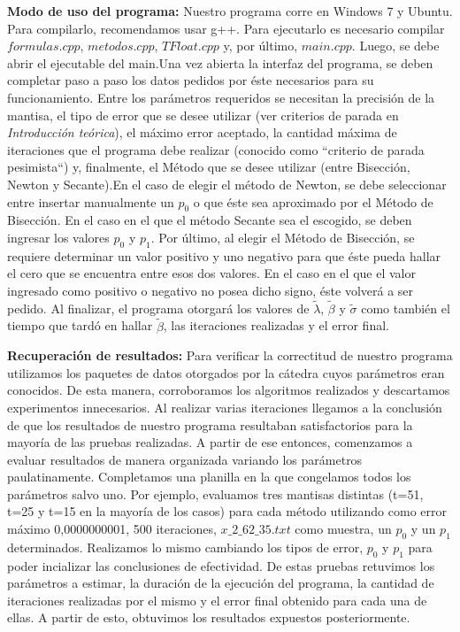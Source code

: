 \documentclass[10pt, a4paper]{article}
\begin{document}
\large{\textbf{Modo de uso del programa:}} 
Nuestro programa corre en Windows 7 y Ubuntu. Para compilarlo, recomendamos usar g++. Para ejecutarlo es necesario compilar $formulas.cpp$, $metodos.cpp$, $TFloat.cpp$ y, por \'ultimo, $main.cpp$. Luego, se debe abrir el ejecutable del main.\newline Una vez abierta la interfaz del programa, se deben completar paso a paso los datos pedidos por \'este necesarios para su funcionamiento. Entre los par\'ametros requeridos se necesitan la precisi\'on de la mantisa, el tipo de error que se desee utilizar (ver criterios de parada en  \textit{Introducci\'on te\'orica}), el m\'aximo error aceptado, la cantidad m\'axima de iteraciones que el programa debe realizar (conocido como ``criterio de parada pesimista``) y, finalmente, el M\'etodo que se desee utilizar (entre Bisecci\'on, Newton y Secante).\newline En el caso de elegir el m\'etodo de Newton, se debe seleccionar entre insertar manualmente un $p_{0}$ o que \'este sea aproximado por el M\'etodo de Bisecci\'on. En el caso en el que el m\'etodo Secante sea el escogido, se deben ingresar los valores $p_{0}$ y $p_{1}$. Por \'ultimo, al elegir el M\'etodo de Bisecci\'on, se requiere determinar un valor positivo y uno negativo para que \'este pueda hallar el cero que se encuentra entre esos dos valores. En el caso en el que el valor ingresado como positivo o negativo no posea dicho signo, \'este volver\'a a ser pedido. Al finalizar, el programa otorgar\'a los valores de $\tilde{\lambda}$, $\tilde{\beta}$ y $\tilde{\sigma}$ como tambi\'en el tiempo que tard\'o en hallar $\tilde{\beta}$, las iteraciones realizadas y el error final.\newline

\large{\textbf{Recuperaci\'on de resultados:}} Para verificar la correctitud de nuestro programa utilizamos los paquetes de datos otorgados por la c\'atedra cuyos par\'ametros eran conocidos. De esta manera, corroboramos los algoritmos realizados y descartamos experimentos innecesarios. Al realizar varias iteraciones llegamos a la conclusi\'on de que los resultados de nuestro programa resultaban satisfactorios para la mayor\'ia de las pruebas realizadas.\newline
 A partir de ese entonces, comenzamos a evaluar resultados de manera organizada variando los par\'ametros paulatinamente. Completamos una planilla en la que congelamos todos los par\'ametros salvo uno. Por ejemplo, evaluamos tres mantisas distintas (t=51, t=25 y t=15 en la mayor\'ia de los casos) para cada m\'etodo utilizando como error m\'aximo 0,0000000001, 500 iteraciones, $x\_2\_62\_35.txt$ como muestra, un $p_{0}$ y un $p_{1}$ determinados. Realizamos lo mismo cambiando los tipos de error, $p_{0}$ y $p_{1}$ para poder incializar las conclusiones de efectividad. De estas pruebas retuvimos los par\'ametros a estimar, la duraci\'on de la ejecuci\'on del programa, la cantidad de iteraciones realizadas por el mismo y el error final obtenido para cada una de ellas. A partir de esto, obtuvimos los resultados expuestos posteriormente.
\end{document}
